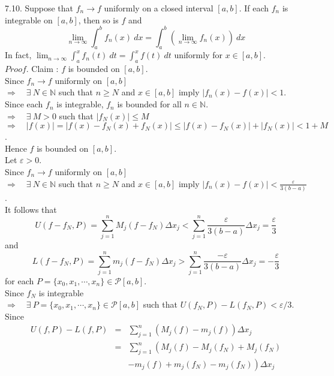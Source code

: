 \documentclass[12pt]{book}
\begin{document}
\begin{CJK}{UTF8}{bsmi}
7.10. Suppose that $f_n\rightarrow f$ uniformly on a closed interval $\left[ a, b \right]$. If each $f_n$ is integrable on $\left[ a, b \right]$, then so is $f$ and
\[
\lim_{n\rightarrow\infty}\int_a^b f_n(x)\ dx
=\int_a^b\left( \lim_{n\rightarrow\infty}f_n(x) \right)\ dx
\]
In fact, $\lim_{n\rightarrow\infty}\int_a^x f_n(t)\ dt=\int_a^x f(t)\ dt$ uniformly for $x\in\left[ a, b \right]$. \\
$Proof$. Claim : $f$ is bounded on $\left[ a, b \right]$.\\
Since $f_n\rightarrow f$ uniformly on $\left[ a, b \right]$ \\
$\Rightarrow\quad\exists\ N\in\mathbb{N}$ such that $n\ge N$ and $x\in\left[ a, b \right]$ imply $|f_n(x)-f(x)|<1$. \\
Since each $f_n$ is integrable, $f_n$ is bounded for all $n\in\mathbb{N}$. \\
$\Rightarrow\quad\exists\ M>0$ such that $|f_N(x)|\le M$ \\
$\Rightarrow\quad |f(x)|
=|f(x)-f_N(x)+f_N(x)|
\le|f(x)-f_N(x)|+|f_N(x)|
<1+M$. \\
Hence $f$ is bounded on $\left[ a, b \right]$. \\
Let $\varepsilon>0$. \\
Since $f_n\rightarrow f$ uniformly on $\left[ a, b \right]$ \\
$\Rightarrow\quad\exists\ N\in\mathbb{N}$ such that $n\ge N$ and $x\in\left[ a, b \right]$ imply $|f_n(x)-f(x)|<\frac{\varepsilon}{3(b-a)}$. \\
It follows that
\[
U(f-f_N, P)
=\sum_{j=1}^n M_j(f-f_N)\Delta x_j
<\sum_{j=1}^n\frac{\varepsilon}{3(b-a)}\Delta x_j
=\frac{\varepsilon}{3}
\]
and
\[
L(f-f_N, P)
=\sum_{j=1}^n m_j(f-f_N)\Delta x_j
>\sum_{j=1}^n\frac{-\varepsilon}{3(b-a)}\Delta x_j
=-\frac{\varepsilon}{3}
\]
for each $P=\{x_0, x_1, \cdots, x_n\}\in\mathcal{P}\left[ a, b \right]$. \\
Since $f_N$ is integrable \\
$\Rightarrow\quad\exists\ P=\{x_0, x_1, \cdots, x_n\}\in\mathcal{P}\left[ a, b \right]$ such that $U(f_N, P)-L(f_N, P)<\varepsilon/3$. \\
Since 
\begin{eqnarray*}
U(f, P) - L(f, P)
    & = & \sum_{j=1}^n \left( M_j(f)-m_j(f) \right)\Delta x_j \\
    & = & \sum_{j=1}^n \left( M_j(f)-M_j(f_N)+M_j(f_N)\right. \\
    &   & \left. -m_j(f)+m_j(f_N)-m_j(f_N) \right)\Delta x_j \\

\end{eqnarray*}
\end{CJK}
\end{document}

